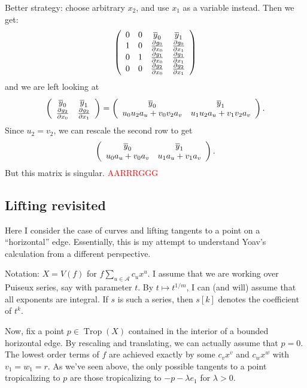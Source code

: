 \documentclass[oneside]{amsart}
\newcommand{\A}{\mathcal{A}}
\DeclareMathOperator{\trop}{Trop}
\theoremstyle{definition}
\newcommand{\nathan}[1]{\textcolor{red}{#1}}
\begin{document}
Better strategy: choose arbitrary $x_2$, and use $x_1$ as a variable instead. Then we get:
\[
\left(
\begin{array}{c c c c }
0 &  0 &  \overline{y}_0  & \overline{y}_1 \\
1 &  0 &  \frac{\partial g_0}{\partial x_0}  & \frac{\partial g_0}{\partial x_1} \\
0 &  1 &  \frac{\partial g_1}{\partial x_0}  & \frac{\partial g_1}{\partial x_1} \\

0 &  0 &  \frac{\partial g_2}{\partial x_0}  & \frac{\partial g_2}{\partial x_1} \\
\end{array}
\right)
\]
and we are left looking at
\[
\left(
\begin{array}{ c c }
  \overline{y}_0  & \overline{y}_1 \\

  \frac{\partial g_2}{\partial x_0}  & \frac{\partial g_2}{\partial x_1} \\
\end{array}
\right)
=
\left(
\begin{array}{ c c }
  \overline{y}_0  & \overline{y}_1 \\
u_0u_2a_u+v_0v_2a_v&
u_1u_2a_u+v_1v_2a_v
\end{array}
\right).
\]
Since $u_2=v_2$, we can rescale the second row to get
\[
\left(
\begin{array}{ c c }
  \overline{y}_0  & \overline{y}_1 \\
u_0a_u+v_0a_v&
u_1a_u+v_1a_v
\end{array}
\right).
\]
But this matrix is singular. \nathan{AARRRGGG}



\subsection{Lifting revisited}
Here I consider the case of curves and lifting tangents to a point on a ``horizontal'' edge. Essentially, this is my attempt to understand Yoav's calculation from a different perspective.

Notation: $X=V(f)$ for $f\sum_{u\in \A} c_ux^u$. I assume that we are working over Puiseux series, say with parameter $t$. By $t\mapsto t^{1/m}$, I can (and will) assume that all exponents are integral. If $s$ is such a series, then $s[k]$ denotes the coefficient of $t^k$.

Now, fix a point $p\in \trop(X)$ contained in the interior of a bounded horizontal edge.
By rescaling and translating, we can actually assume that $p=0$.
The lowest order terms of $f$ are achieved exactly by some $c_vx^v$ and $c_wx^w$ with $v_1=w_1=r$. As we've seen above, the only possible tangents to a point tropicalizing to $p$ are those tropicalizing to $-p-\lambda e_1$ for $\lambda >0$.
\end{document}
